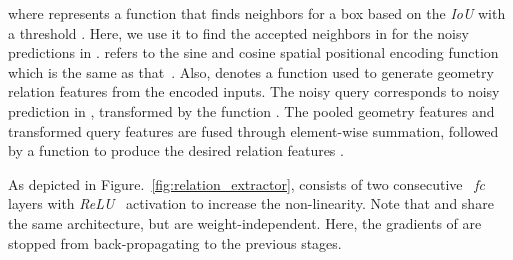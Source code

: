\documentclass[final]{cvpr}
\begin{document}
\vspace{-5pt}

where  represents a function that finds neighbors for a box  based on the \textit{IoU}  with a threshold . Here, we use it to find the accepted neighbors in  for the noisy predictions in .  refers to the sine and cosine spatial positional encoding function which is the same as that~\cite{hu2018relation, attnyouneed}. Also,  denotes a function used to generate geometry relation features  from the encoded inputs. The noisy query  corresponds to noisy prediction  in , transformed by the function . The pooled geometry features and transformed query features  are fused through element-wise summation, followed by a function  to produce the desired relation features .

As depicted in Figure.~\ref{fig:relation_extractor},  consists of two consecutive ~\textit{fc} layers with \textit{ReLU}~\cite{maas2013rectifier} activation to increase the  non-linearity. Note that  and  share the same architecture, but are weight-independent. Here, the gradients of  are stopped from back-propagating to the previous stages.
\end{document}
